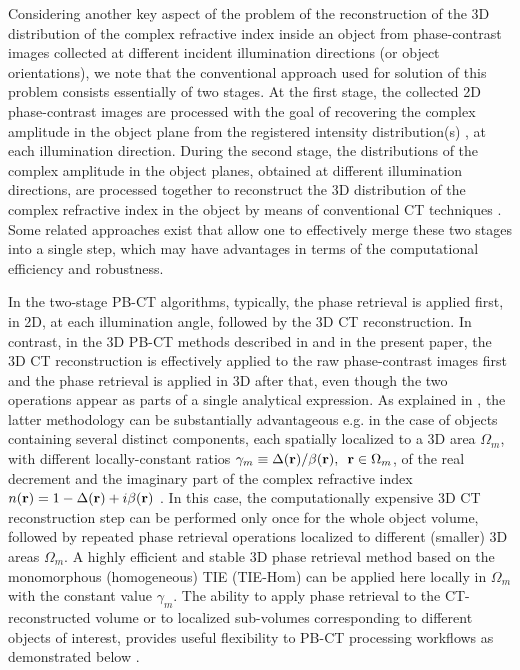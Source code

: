 \documentclass[twocolumn, switch]{article} %
\begin{document}
Considering another key aspect of the problem of the reconstruction of the 3D distribution of the complex refractive index inside an object from phase-contrast images collected at different incident illumination directions (or object orientations), we note that the conventional approach used for solution of this problem consists essentially of two stages. At the first stage, the collected 2D phase-contrast images are processed with the goal of recovering the complex amplitude in the object plane from the registered intensity distribution(s) \cite{Gureyev2004LinearRegion}, at each illumination direction. During the second stage, the distributions of the complex amplitude in the object planes, obtained at different illumination directions, are processed together to reconstruct the 3D distribution of the complex refractive index in the object by means of conventional CT techniques \cite{Natterer2001TheTomography}. Some related approaches exist \cite{Bronnikov1999ReconstructionTomography, Bronnikov2002TheoryTomography, Gureyev2006Phase-and-amplitudeTomography, Gureyev2022UnifiedTomography} that allow one to effectively merge these two stages into a single step, which may have advantages in terms of the computational efficiency and robustness.

In the two-stage PB-CT algorithms, typically, the phase retrieval is applied first, in 2D, at each illumination angle, followed by the 3D CT reconstruction. In contrast, in the 3D PB-CT methods described in \cite{Thompson2019FastTomography} and in the present paper, the 3D CT reconstruction is effectively applied to the raw phase-contrast images first and the phase retrieval is applied in 3D after that, even though the two operations appear as parts of a single analytical expression. As explained in \cite{Thompson2019FastTomography}, the latter methodology can be substantially advantageous e.g. in the case of objects containing several distinct components, each spatially localized to a 3D area ${\Omega _m}$, with different locally-constant ratios ${\gamma _m} \equiv \Delta ({\bf{r}})/\beta ({\bf{r}}),\,\,\,{\bf{r}} \in {\Omega _m}$, of the real decrement and the imaginary part of the complex refractive index $n({\bf{r}}) = 1 - \Delta ({\bf{r}}) + i\beta ({\bf{r}})$ \cite{Beltran20102DDistance}. In this case, the computationally expensive 3D CT reconstruction step can be performed only once for the whole object volume, followed by repeated phase retrieval operations localized to different (smaller) 3D areas ${\Omega _m}$. A highly efficient and stable 3D phase retrieval method based on the monomorphous (homogeneous) TIE (TIE-Hom) \cite{Paganin2002SimultaneousObject} can be applied here locally in ${\Omega _m}$ with the constant value ${\gamma _m}$. The ability to apply phase retrieval to the CT-reconstructed volume or to localized sub-volumes corresponding to different objects of interest, provides useful flexibility to PB-CT processing workflows as demonstrated below \cite{Donato2022OptimizationTomography, Pollock2023RobustObjects}.
\end{document}
